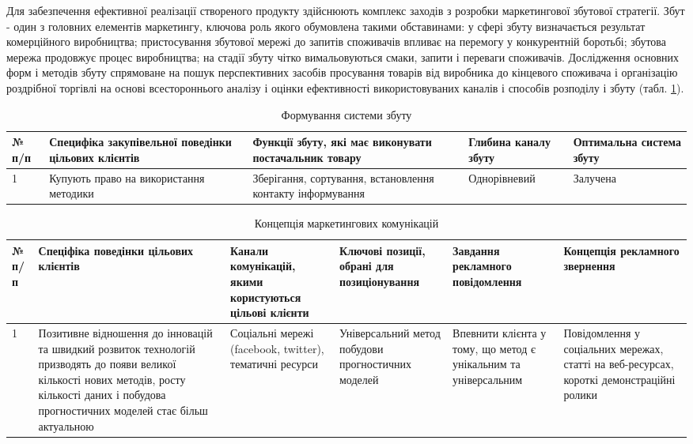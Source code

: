 Для забезпечення ефективної реалізації створеного продукту здійснюють комплекс заходів з розробки маркетингової збутової стратегії. Збут - один з головних елементів маркетингу, ключова роль якого обумовлена такими обставинами: у сфері збуту визначається результат комерційного виробництва; пристосування збутової мережі до запитів споживачів впливає на перемогу у конкурентній боротьбі; збутова мережа продовжує процес виробництва; на стадії збуту чітко вимальовуються смаки, запити і переваги споживачів. Дослідження основних форм і методів збуту спрямоване на пошук перспективних засобів просування товарів від виробника до кінцевого споживача і організацію роздрібної торгівлі на основі всестороннього аналізу і оцінки ефективності використовуваних каналів і способів розподілу і збуту (табл. \ref{tab:stab_16}).

\begin{table}[h!]
\fontsize{12pt}{12pt}\selectfont
	\begin{tabularx}{\textwidth}{|l|X|X|X|X|}
    \hline
    № п/п & Специфіка закупівельної поведінки цільових клієнтів & Функції збуту, які має виконувати постачальник товару & Глибина каналу збуту & Оптимальна система збуту \\ \hline
    1 & Купують право на використання методики & Зберігання, сортування, встановлення контакту інформування & Однорівневий & Залучена \\
    \hline
    \end{tabularx}
\caption{Формування системи збуту} \label{tab:stab_16}
\end{table}

\begin{table}[h!]
\fontsize{12pt}{12pt}\selectfont
	\begin{tabularx}{\textwidth}{|l|X|X|X|X|X|}
    \hline
    № п/п & Спеціфіка поведінки цільових клієнтів & Канали комунікацій, якими користуються цільові клієнти & Ключові позиції, обрані для позиціонування & Завдання рекламного повідомлення & Концепція рекламного звернення \\ \hline
    1 & Позитивне відношення до інновацій та швидкий розвиток технологій призводять до появи великої кількості нових методів, росту кількості даних і побудова прогностичних моделей стає більш актуальною & Соціальні мережі (facebook, twitter), тематичні ресурси & Універсальний метод побудови прогностичних моделей & Впевнити клієнта у тому, що метод є унікальним та універсальним & Повідомлення у соціальних мережах, статті на веб-ресурсах, короткі демонстраційні ролики \\
    \hline
    \end{tabularx}
\caption{Концепція маркетингових комунікацій} \label{tab:stab_17}
\end{table}

